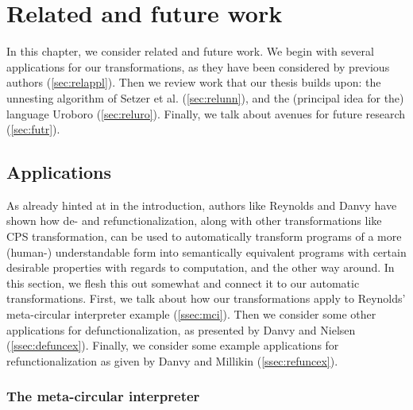 \chapter{Related and future work}

In this chapter, we consider related and future work. We begin with several applications for our transformations, as they have been considered by previous authors (\autoref{sec:relappl}). Then we review work that our thesis builds upon: the unnesting algorithm of Setzer et al. (\autoref{sec:relunn}), and the (principal idea for the) language Uroboro (\autoref{sec:reluro}). Finally, we talk about avenues for future research (\autoref{sec:futr}).

\section{Applications}
\label{sec:relappl}

As already hinted at in the introduction, authors like Reynolds and Danvy have shown how de- and refunctionalization, along with other transformations like CPS transformation, can be used to automatically transform programs of a more (human-) understandable form into semantically equivalent programs with certain desirable properties with regards to computation, and the other way around. In this section, we flesh this out somewhat and connect it to our automatic transformations. First, we talk about how our transformations apply to Reynolds' meta-circular interpreter example (\autoref{ssec:mci}). Then we consider some other applications for defunctionalization, as presented by Danvy and Nielsen\cite{danvy01defunctionalization} (\autoref{ssec:defuncex}). Finally, we consider some example applications for refunctionalization as given by Danvy and Millikin\cite{danvy09refunctionalization} (\autoref{ssec:refuncex}).

\subsection{The meta-circular interpreter}
\label{ssec:mci}

